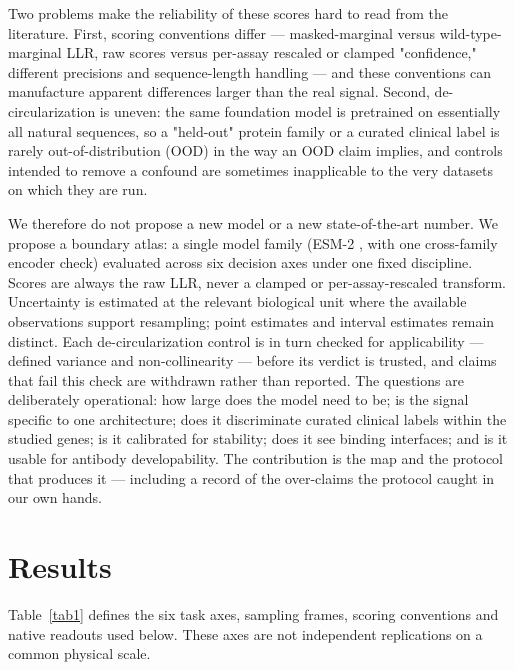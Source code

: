 \documentclass[12pt]{article}
\begin{document}
Two problems make the reliability of these scores hard to read from the literature. First, scoring conventions differ --- masked-marginal versus wild-type-marginal LLR, raw scores versus per-assay rescaled or clamped "confidence," different precisions and sequence-length handling --- and these conventions can manufacture apparent differences larger than the real signal. Second, de-circularization is uneven: the same foundation model is pretrained on essentially all natural sequences, so a "held-out" protein family or a curated clinical label is rarely out-of-distribution (OOD) in the way an OOD claim implies, and controls intended to remove a confound are sometimes inapplicable to the very datasets on which they are run.

We therefore do not propose a new model or a new state-of-the-art number. We propose a boundary atlas: a single model family (ESM-2 \citep{Lin2023}, with one cross-family encoder check) evaluated across six decision axes under one fixed discipline. Scores are always the raw LLR, never a clamped or per-assay-rescaled transform. Uncertainty is estimated at the relevant biological unit where the available observations support resampling; point estimates and interval estimates remain distinct. Each de-circularization control is in turn checked for applicability --- defined variance and non-collinearity --- before its verdict is trusted, and claims that fail this check are withdrawn rather than reported. The questions are deliberately operational: how large does the model need to be; is the signal specific to one architecture; does it discriminate curated clinical labels within the studied genes; is it calibrated for stability; does it see binding interfaces; and is it usable for antibody developability. The contribution is the map and the protocol that produces it --- including a record of the over-claims the protocol caught in our own hands.

\section{Results}

Table~\ref{tab1} defines the six task axes, sampling frames, scoring
conventions and native readouts used below. These axes are not independent
replications on a common physical scale.
\end{document}
